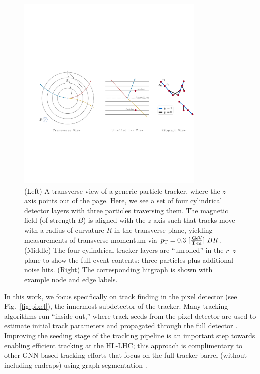 \documentclass[twocolumn]{svjour3}
\newcommand{\pt}{\ensuremath{p_{\mathrm{T}}}\xspace}
\newcommand{\GeV}{\ensuremath{\,\text{Ge\hspace{-.08em}V}}\xspace}
\begin{document}
\begin{figure}[!htbp]
\centering
\includegraphics[width=0.8\textwidth,clip]{tracking_diagram.pdf}
\caption{(Left) A transverse view of a generic particle tracker, where the $z$-axis points out of the page. 
Here, we see a set of four cylindrical detector layers with three particles traversing them. 
The magnetic field (of strength $B$) is aligned with the $z$-axis such that tracks move with a radius of curvature $R$ in the transverse plane, yielding measurements of transverse momentum via $\pt=0.3\ [\frac{\GeV}{\text{T}\cdot\text{m}}]\ BR$. 
(Middle) The four cylindrical tracker layers are ``unrolled'' in the $r$--$z$ plane to show the full event contents: three particles plus additional noise hits. 
(Right) The corresponding hitgraph is shown with example node and edge labels. }
\label{fig:tracking} 
\end{figure}

In this work, we focus specifically on track finding in the pixel detector (see Fig.~\ref{fig:pixel}), the innermost subdetector of the tracker. 
Many tracking algorithms run ``inside out,'' where track seeds from the pixel detector are used to estimate initial track parameters and propagated through the full detector \cite{cms_tracking}.  
Improving the seeding stage of the tracking pipeline is an important step towards enabling efficient tracking at the HL-LHC; this approach is complimentary to other GNN-based tracking efforts that focus on the full tracker barrel (without including endcaps) using graph segmentation \cite{exatrkx}. 
\end{document}
